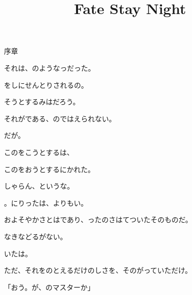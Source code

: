 \documentclass{article}        %
\title{Fate Stay Night} %
\author{}
\date{}
\begin{document}
\maketitle

\fontsize{15}{23}
\selectfont

\begin{CJK*}{UTF8}{gbsn}
 \begin{center}序章\end{center}

\end{CJK*}

\begin{CJK}{UTF8}{min}
それは、のようなっだった。

をしにせんとりされるの。

そうとするみはだろう。

それがである、のではえられない。

だが。

このをこうとするは、

このをおうとするにかれた。

しゃらん、というな。

。にりったは、よりもい。

およそやかさとはであり、ったのさはてついたそのものだ。

なきなどるがない。

いたは。

ただ、それをのとえるだけのしさを、そのがっていただけ。

「おう。が、のマスターか」


\end{CJK}
\end{document}
